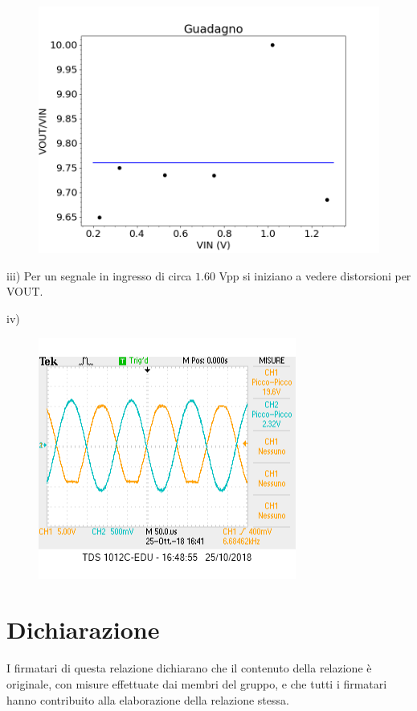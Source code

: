 \documentclass[10pt,a4paper]{article}
\begin{document}
\begin{figure}[h]
	\centering
	\includegraphics[scale=0.5]{guadagno.png}

	
	
\end{figure}

iii) Per un segnale in ingresso di circa $1.60$ \si{\volt}pp si iniziano a vedere distorsioni per VOUT.

iv)\begin{figure}[h]
	\centering
	\includegraphics[scale=0.5]{clipping.png}

	
	
\end{figure}

	

\section*{Dichiarazione}
I firmatari di questa relazione dichiarano che il contenuto della relazione \`e originale, con misure effettuate dai membri del gruppo, e che tutti i firmatari hanno contribuito alla elaborazione della relazione stessa.
\end{document}

